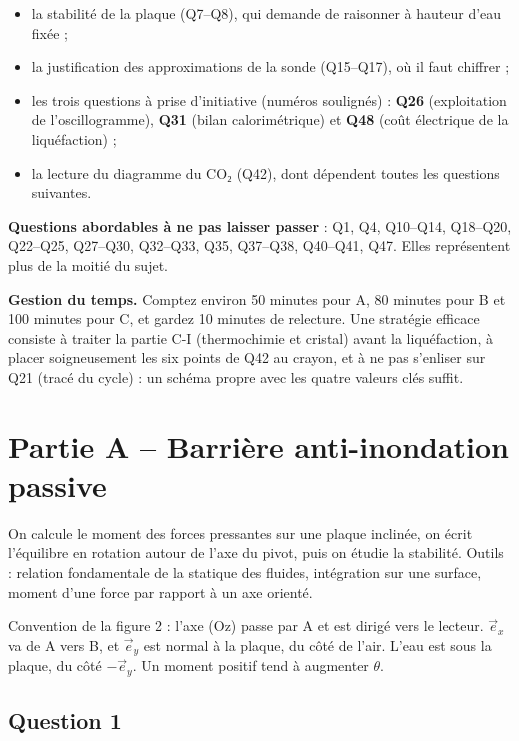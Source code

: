 \documentclass[11pt,a4paper]{article}
\providecommand{\tightlist}{\setlength{\itemsep}{0pt}\setlength{\parskip}{0pt}}
\begin{document}
\begin{itemize}
\tightlist
\item
  la stabilité de la plaque (Q7--Q8), qui demande de raisonner à hauteur d'eau fixée ;
\item
  la justification des approximations de la sonde (Q15--Q17), où il faut chiffrer ;
\item
  les trois questions à prise d'initiative (numéros soulignés) : \textbf{Q26} (exploitation de l'oscillogramme), \textbf{Q31} (bilan calorimétrique) et \textbf{Q48} (coût électrique de la liquéfaction) ;
\item
  la lecture du diagramme du CO₂ (Q42), dont dépendent toutes les questions suivantes.
\end{itemize}

\textbf{Questions abordables à ne pas laisser passer} : Q1, Q4, Q10--Q14, Q18--Q20, Q22--Q25, Q27--Q30, Q32--Q33, Q35, Q37--Q38, Q40--Q41, Q47. Elles représentent plus de la moitié du sujet.

\textbf{Gestion du temps.} Comptez environ 50 minutes pour A, 80 minutes pour B et 100 minutes pour C, et gardez 10 minutes de relecture. Une stratégie efficace consiste à traiter la partie C-I (thermochimie et cristal) avant la liquéfaction, à placer soigneusement les six points de Q42 au crayon, et à ne pas s'enliser sur Q21 (tracé du cycle) : un schéma propre avec les quatre valeurs clés suffit.

\hypertarget{partie-a-barriuxe8re-anti-inondation-passive}{%
\section{Partie A -- Barrière anti-inondation passive}\label{partie-a-barriuxe8re-anti-inondation-passive}}

On calcule le moment des forces pressantes sur une plaque inclinée, on écrit l'équilibre en rotation autour de l'axe du pivot, puis on étudie la stabilité. Outils : relation fondamentale de la statique des fluides, intégration sur une surface, moment d'une force par rapport à un axe orienté.

Convention de la figure 2 : l'axe (Oz) passe par A et est dirigé vers le lecteur. \(\vec e_x\) va de A vers B, et \(\vec e_y\) est normal à la plaque, du côté de l'air. L'eau est sous la plaque, du côté \(-\vec e_y\). Un moment positif tend à augmenter \(\theta\).

\hypertarget{question-1}{%
\subsection{Question 1}\label{question-1}}
\end{document}

